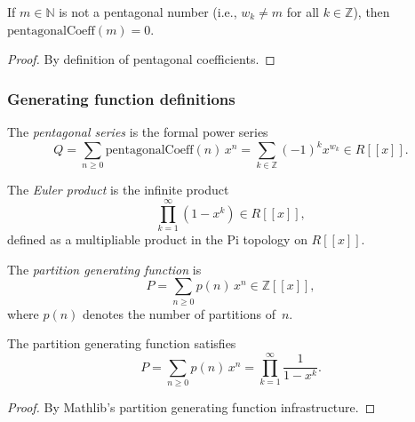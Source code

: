 \begin{lemma}
\label{lem.pent.coeff-zero-non-pentagonal}
\leanhelper
\leanok
If $m\in\mathbb{N}$ is not a pentagonal number (i.e., $w_k \neq m$ for all $k\in\mathbb{Z}$),
then $\mathrm{pentagonalCoeff}(m) = 0$.
\end{lemma}

\begin{proof}
\leanok
By definition of pentagonal coefficients.
\end{proof}

\subsubsection{Generating function definitions}

\begin{definition}
\label{def.pent.pentagonalSeries}
\leanhelper
\leanok
The \emph{pentagonal series} is the formal power series
\[
Q = \sum_{n\geq 0} \mathrm{pentagonalCoeff}(n)\, x^n
  = \sum_{k\in\mathbb{Z}} (-1)^k x^{w_k}
  \in R[[x]].
\]
\end{definition}

\begin{definition}
\label{def.pent.eulerProduct}
\leanhelper
\leanok
The \emph{Euler product} is the infinite product
\[
\prod_{k=1}^{\infty}(1 - x^k) \in R[[x]],
\]
defined as a multipliable product in the Pi topology on $R[[x]]$.
\end{definition}

\begin{definition}
\label{def.fps.partitionGenFun}
\leanhelper
\leanok
The \emph{partition generating function} is
\[
P = \sum_{n\geq 0} p(n)\, x^n \in \mathbb{Z}[[x]],
\]
where $p(n)$ denotes the number of partitions of~$n$.
\end{definition}

\begin{lemma}
\label{lem.fps.partition-gen-fun-eq}
\leanhelper
\leanok
The partition generating function satisfies
\[
P = \sum_{n\geq 0} p(n)\, x^n = \prod_{k=1}^{\infty}\frac{1}{1-x^k}.
\]
\end{lemma}

\begin{proof}
\leanok
By Mathlib's partition generating function infrastructure.
\end{proof}

